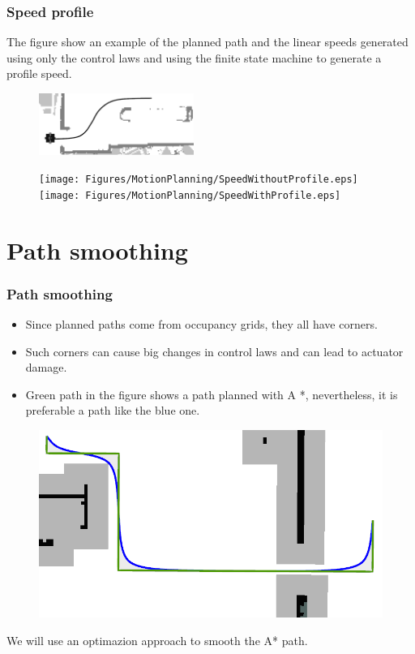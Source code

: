 \begin{frame}\frametitle{Speed profile}
  The figure show an example of the planned path and the linear speeds generated using only the control laws and using the finite state machine to generate a profile speed. 
  \begin{figure}
    \centering
    \includegraphics[width=0.45\textwidth]{Figures/MotionPlanning/SpeedProfilePath.png}
  \end{figure}
  \begin{figure}
    \centering
    \texttt{[image: Figures/MotionPlanning/SpeedWithoutProfile.eps]}
    \texttt{[image: Figures/MotionPlanning/SpeedWithProfile.eps]}
  \end{figure}
\end{frame}

\section{Path smoothing}
\begin{frame}\frametitle{Path smoothing}
  \begin{itemize}
  \item Since planned paths come from occupancy grids, they all have corners.
  \item Such corners can cause big changes in control laws and can lead to actuator damage.
  \item Green path in the figure shows a path planned with A *, nevertheless, it is preferable a path like the blue one.
  \end{itemize}
  \begin{figure}
    \centering
    \includegraphics[height=0.45\textheight]{Figures/MotionPlanning/PathSmoothingExample.png}
  \end{figure}
  We will use an optimazion approach to smooth the A* path.
\end{frame}

